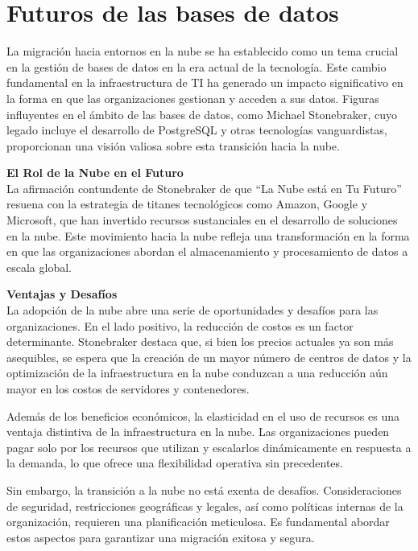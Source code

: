 \documentclass[11pt]{report}
\begin{document}
\cleardoublepage

\section{Futuros de las bases de datos}
La migración hacia entornos en la nube se ha establecido como un tema crucial en la gestión de bases de datos en la era actual de la tecnología. Este 
cambio fundamental en la infraestructura de TI ha generado un impacto significativo en la forma en que las organizaciones gestionan y acceden a sus datos.
Figuras influyentes en el ámbito de las bases de datos, como Michael Stonebraker, cuyo legado incluye el desarrollo de PostgreSQL y otras tecnologías vanguardistas,
proporcionan una visión valiosa sobre esta transición hacia la nube.

\textbf{El Rol de la Nube en el Futuro} \\
La afirmación contundente de Stonebraker de que “La Nube está en Tu Futuro” resuena con la estrategia de titanes tecnológicos como Amazon, Google y Microsoft, 
que han invertido recursos sustanciales en el desarrollo de soluciones en la nube. Este movimiento hacia la nube refleja una transformación en la forma en que
las organizaciones abordan el almacenamiento y procesamiento de datos a escala global.

\textbf{Ventajas y Desafíos} \\
La adopción de la nube abre una serie de oportunidades y desafíos para las organizaciones. En el lado positivo, la reducción de costos es un factor determinante. 
Stonebraker destaca que, si bien los precios actuales ya son más asequibles, se espera que la creación de un mayor número de centros de datos y la optimización de
la infraestructura en la nube conduzcan a una reducción aún mayor en los costos de servidores y contenedores.

Además de los beneficios económicos, la elasticidad en el uso de recursos es una ventaja distintiva de la infraestructura en la nube. Las organizaciones pueden
pagar solo por los recursos que utilizan y escalarlos dinámicamente en respuesta a la demanda, lo que ofrece una flexibilidad operativa sin precedentes.

Sin embargo, la transición a la nube no está exenta de desafíos. Consideraciones de seguridad, restricciones geográficas y legales, así como políticas internas de
la organización, requieren una planificación meticulosa. Es fundamental abordar estos aspectos para garantizar una migración exitosa y segura.
\end{document}
